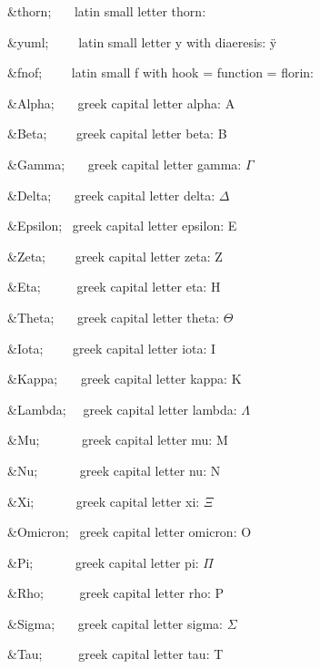 \begin{DoxyItemize}
\item {\ttfamily \&thorn;}{\ttfamily ~~~} latin small letter thorn\+: \th 
\item {\ttfamily \&yuml;}{\ttfamily ~~~~} latin small letter y with diaeresis\+: \"{y} 
\item {\ttfamily \&fnof;}{\ttfamily ~~~~} latin small f with hook = function = florin\+: \textflorin 
\item {\ttfamily \&Alpha;}{\ttfamily ~~~} greek capital letter alpha\+: A 
\item {\ttfamily \&Beta;}{\ttfamily ~~~~} greek capital letter beta\+: B 
\item {\ttfamily \&Gamma;}{\ttfamily ~~~} greek capital letter gamma\+: {$\Gamma$} 
\item {\ttfamily \&Delta;}{\ttfamily ~~~} greek capital letter delta\+: {$\Delta$} 
\item {\ttfamily \&Epsilon;}{\ttfamily ~} greek capital letter epsilon\+: E 
\item {\ttfamily \&Zeta;}{\ttfamily ~~~~} greek capital letter zeta\+: Z 
\item {\ttfamily \&Eta;}{\ttfamily ~~~~~} greek capital letter eta\+: H 
\item {\ttfamily \&Theta;}{\ttfamily ~~~} greek capital letter theta\+: {$\Theta$} 
\item {\ttfamily \&Iota;}{\ttfamily ~~~~} greek capital letter iota\+: I 
\item {\ttfamily \&Kappa;}{\ttfamily ~~~} greek capital letter kappa\+: K 
\item {\ttfamily \&Lambda;}{\ttfamily ~~} greek capital letter lambda\+: {$\Lambda$} 
\item {\ttfamily \&Mu;}{\ttfamily ~~~~~~} greek capital letter mu\+: M 
\item {\ttfamily \&Nu;}{\ttfamily ~~~~~~} greek capital letter nu\+: N 
\item {\ttfamily \&Xi;}{\ttfamily ~~~~~~} greek capital letter xi\+: {$\Xi$} 
\item {\ttfamily \&Omicron;}{\ttfamily ~} greek capital letter omicron\+: O 
\item {\ttfamily \&Pi;}{\ttfamily ~~~~~~} greek capital letter pi\+: {$\Pi$} 
\item {\ttfamily \&Rho;}{\ttfamily ~~~~~} greek capital letter rho\+: P 
\item {\ttfamily \&Sigma;}{\ttfamily ~~~} greek capital letter sigma\+: {$\Sigma$} 
\item {\ttfamily \&Tau;}{\ttfamily ~~~~~} greek capital letter tau\+: T 

\end{DoxyItemize}
